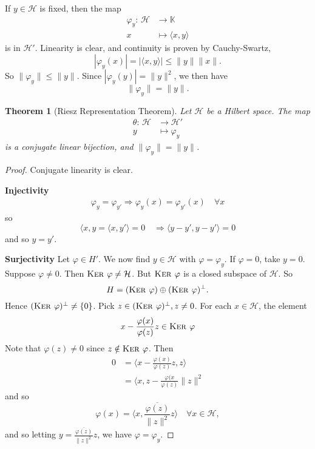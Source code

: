 \documentclass[10pt, oneside, reqno]{amsbook}
\theoremstyle{plain}%
\newtheorem{thm}{Theorem}[section]
\theoremstyle{definition}
\theoremstyle{remark}
\newcommand{\K}{\mathbb{K}}
\newcommand{\Hil}{\mathcal{H}}
\newcommand{\mapping}[5]{\begin{align*}
    #1 : \,     #2 &\rightarrow #3 \\
            #4  &\mapsto #5
\end{align*}    
}
\renewcommand{\phi}{\varphi}
\renewcommand{\ker}{\textsc{Ker\ }}
\begin{document}

If $y \in \Hil$ is fixed, then the map \mapping{\phi_y}{\Hil}{\K}{x}{\langle x, y \rangle} is in $\Hil'$.  Linearity is clear, and continuity is proven by Cauchy-Swartz, \[
    | \phi_y(x) | = | \langle x, y \rangle | \leq \| y \| \| x \|.
\] So $\| \phi_y \| \leq \| y \|$. Since $|\phi_y(y)| = \| y \|^2$, we then have \[
    \| \phi_y \| = \| y \|.
\]

\begin{thm}[Riesz Representation Theorem]
    Let $\Hil$ be a Hilbert space. The map \mapping{\theta}{\Hil}{\Hil'}{y}{\phi_y} is a conjugate linear bijection, and $\| \phi_y \| = \| y \|$.  
\end{thm}
\begin{proof}
    Conjugate linearity is clear.
    
    \textbf{Injectivity} 
    \begin{align*}
        \phi_y = \phi_{y'} \Rightarrow \phi_y(x) = \phi_{y'}(x) \quad \forall x
    \end{align*} so \[
        \langle x, y = \langle x, y' \rangle  = 0 \quad \Rightarrow \langle y - y', y - y' \rangle = 0
    \] and so $y = y'$.
    
    \textbf{Surjectivity}
    Let $\phi \in H'$.  We now find $y \in \Hil$ with $\phi = \phi_y$.  If $\phi = 0$, take $y = 0$.  Suppose $\phi \neq 0$.  Then $\ker \phi \neq \Hil$.  But $\ker \phi$ is a closed subspace of $\Hil$.  So \[
        H = (\ker \phi) \oplus (\ker \phi)^\perp.
    \] Hence $(\ker \phi)^\perp \neq \{ 0 \}$. Pick $z \in (\ker \phi)^\perp, z \neq 0$.  For each $x \in \Hil$, the element \[
        x - \frac{\phi(x)}{\phi(z)} z \in \ker \phi
    \] Note that $\phi(z) \neq 0$ since $z \notin \ker \phi$.  Then \begin{align*}
        0   &=  \langle x - \frac{\phi(x)}{\phi(z)}z, z \rangle \\
            &= \langle x, z - \frac{\phi(x}{\phi(z)} \| z \|^2
    \end{align*}
    and so \[
    \phi(x) = \langle x, \frac{\overline{\phi(z)}}{\| z \|^2} z \rangle \quad \forall x \in \Hil,\]
    and so letting $y = \frac{\overline{\phi(z)}}{\| z \|^2} z$, we have $\phi = \phi_y$.  
\end{proof}
\end{document}
